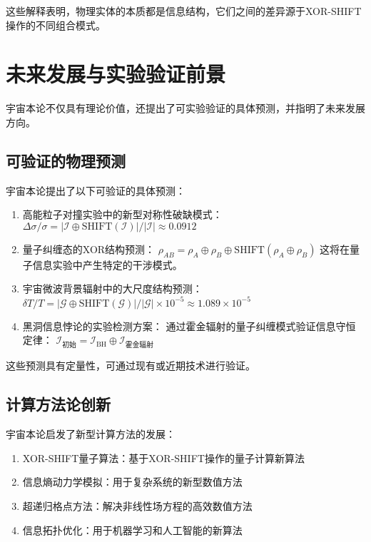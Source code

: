 这些解释表明，物理实体的本质都是信息结构，它们之间的差异源于XOR-SHIFT操作的不同组合模式。

\section{未来发展与实验验证前景}

宇宙本论不仅具有理论价值，还提出了可实验验证的具体预测，并指明了未来发展方向。

\subsection{可验证的物理预测}

宇宙本论提出了以下可验证的具体预测：

\begin{enumerate}
  \item 高能粒子对撞实验中的新型对称性破缺模式：
  $\Delta\sigma/\sigma = |\mathcal{I} \oplus \text{SHIFT}(\mathcal{I})|/|\mathcal{I}| \approx 0.0912$
  
  \item 量子纠缠态的XOR结构预测：
  $\rho_{AB} = \rho_A \oplus \rho_B \oplus \text{SHIFT}(\rho_A \oplus \rho_B)$
  这将在量子信息实验中产生特定的干涉模式。
  
  \item 宇宙微波背景辐射中的大尺度结构预测：
  $\delta T/T = |\mathcal{G} \oplus \text{SHIFT}(\mathcal{G})| / |\mathcal{G}| \times 10^{-5} \approx 1.089 \times 10^{-5}$
  
  \item 黑洞信息悖论的实验检测方案：
  通过霍金辐射的量子纠缠模式验证信息守恒定律：
  $\mathcal{I}_{\text{初始}} = \mathcal{I}_{\text{BH}} \oplus \mathcal{I}_{\text{霍金辐射}}$
\end{enumerate}

这些预测具有定量性，可通过现有或近期技术进行验证。

\subsection{计算方法论创新}

宇宙本论启发了新型计算方法的发展：

\begin{enumerate}
  \item XOR-SHIFT量子算法：基于XOR-SHIFT操作的量子计算新算法
  \item 信息熵动力学模拟：用于复杂系统的新型数值方法
  \item 超递归格点方法：解决非线性场方程的高效数值方法
  \item 信息拓扑优化：用于机器学习和人工智能的新算法
\end{enumerate}

